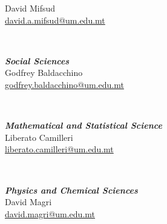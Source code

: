 {\begin{scriptsize}
\noindent\parbox{0.5\textwidth}{
David Mifsud\\
\href{mailto:david.a.mifsud@um.edu.mt}{david.a.mifsud@um.edu.mt}
}\\[2ex]
%
\parbox{0.5\textwidth}{
\noindent\textbf{\textit{Social Sciences}}\\
Godfrey Baldacchino\\
\href{mailto:godfrey.baldacchino@um.edu.mt}{godfrey.baldacchino@um.edu.mt}
}\\[2ex]
%
\parbox{0.5\textwidth}{
\noindent\textbf{\textit{Mathematical and Statistical Science}}\\
Liberato Camilleri\\
\href{mailto:liberato.camilleri@um.edu.mt}{liberato.camilleri@um.edu.mt}
}\\[2ex]
%
\parbox{0.5\textwidth}{
\noindent\textbf{\textit{Physics and Chemical Sciences}}\\
David Magri\\
\href{mailto:david.magri@um.edu.mt}{david.magri@um.edu.mt}
}\\
%
\end{scriptsize}

}
